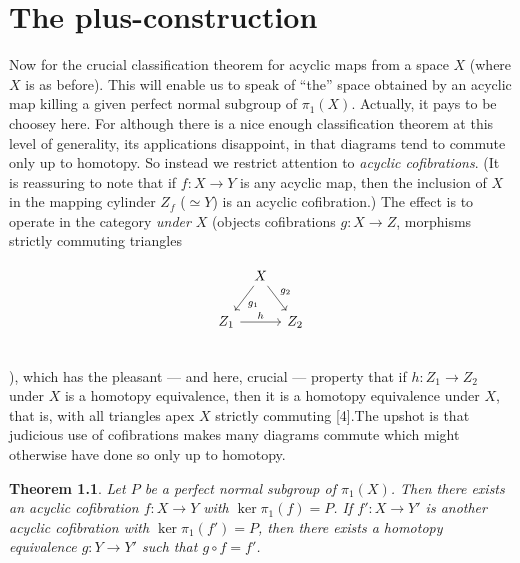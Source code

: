 \documentclass[openany,leqno]{book}  %
\newtheorem{theorem}{Theorem}[chapter]
\begin{document}

\chapter{The plus-construction} %
\label{cha:5the_plus_construction}
Now for the crucial classification theorem for acyclic maps from a space $X$ (where $X$ is as before). This will enable us to speak of ``the'' space obtained by an acyclic map killing a given perfect normal subgroup of $\pi_1(X)$. Actually, it pays to be choosey here. For although there is a
nice enough classification theorem at this level of generality, its applications disappoint, in that diagrams tend to commute only up to homotopy. So instead we restrict attention to {\em acyclic cofibrations}. (It is reassuring to note that if $f\colon   X \longrightarrow Y$ is any acyclic map, then the inclusion of $X$ in the mapping cylinder $Z_f$ ($\simeq Y$) is an acyclic cofibration.) The effect is to operate in the category {\em under} $X$ (objects cofibrations $g \colon   X \longrightarrow Z$, morphisms strictly commuting triangles

\[
\begin{tikzcd}[column sep=tiny]
& X \arrow[dl,"g_1"] \arrow{dr}{g_2}& \\
Z_1 \arrow{rr}{h}  & &Z_2 \\
\end{tikzcd}
\]
),
which has the pleasant --- and here, crucial --- property that if $h \colon   Z_1\longrightarrow Z_2$ under $X$ is a homotopy equivalence, then it is a homotopy equivalence under $X$, that is, with all triangles apex $X$ strictly commuting [4].The upshot is that judicious use of cofibrations makes many diagrams commute which might otherwise have done so only up to homotopy.

\begin{theorem}
Let $P$ be a perfect normal subgroup of $\pi_1 (X)$. Then there exists an acyclic cofibration $f\colon   X \longrightarrow  Y$ with $\ker \pi_1 (f) = P$. If $f'\colon   X \longrightarrow Y'$ is another acyclic cofibration with $\ker \pi_1(f') = P$, then there exists a homotopy equivalence $g \colon   Y \longrightarrow Y'$ such that $g\circ f =f'$.
\end{theorem}
\end{document}
